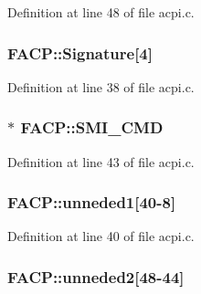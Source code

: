 Definition at line 48 of file acpi.\+c.

\subsubsection[{\texorpdfstring{Signature}{Signature}}]{ F\+A\+C\+P\+::\+Signature\mbox{[}4\mbox{]}}\hypertarget{structFACP_a3ec5cc094770cdaf54942c95b5a4eae3}{}\label{structFACP_a3ec5cc094770cdaf54942c95b5a4eae3}


Definition at line 38 of file acpi.\+c.

\subsubsection[{\texorpdfstring{S\+M\+I\+\_\+\+C\+MD}{SMI_CMD}}]{$\ast$ F\+A\+C\+P\+::\+S\+M\+I\+\_\+\+C\+MD}\hypertarget{structFACP_a1ec5f1557834030b62601ecbf75eae9c}{}\label{structFACP_a1ec5f1557834030b62601ecbf75eae9c}


Definition at line 43 of file acpi.\+c.

\subsubsection[{\texorpdfstring{unneded1}{unneded1}}]{ F\+A\+C\+P\+::unneded1\mbox{[}40-\/8\mbox{]}}\hypertarget{structFACP_ae5f7c21401a9d170e5c6a3caaa9b74ba}{}\label{structFACP_ae5f7c21401a9d170e5c6a3caaa9b74ba}


Definition at line 40 of file acpi.\+c.

\subsubsection[{\texorpdfstring{unneded2}{unneded2}}]{ F\+A\+C\+P\+::unneded2\mbox{[}48-\/44\mbox{]}}\hypertarget{structFACP_a6926f57eda7c9c85a3f7509b1d3080c6}{}\label{structFACP_a6926f57eda7c9c85a3f7509b1d3080c6}


